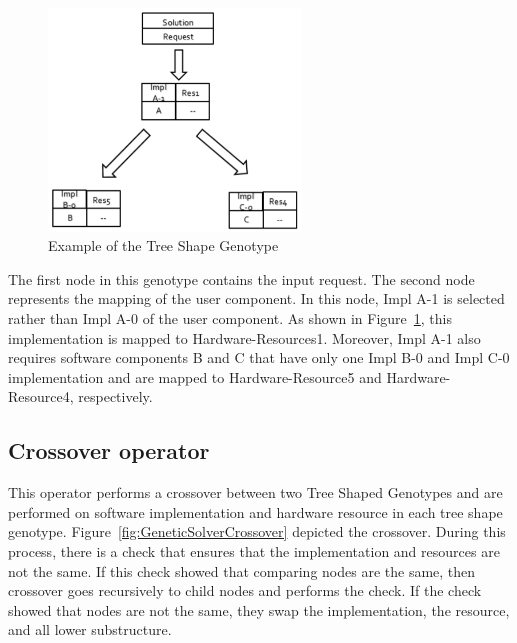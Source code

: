 \begin{figure}
	\centering
	\includegraphics[width=0.6\textwidth]{images/TreeShapeGenotypeExample.png}
	\caption[Example of the Tree Shape Genotype]{Example of the Tree Shape Genotype}
	\label{fig:TreeShapeGenotypeExample}
\end{figure}

The first node in this genotype contains the input request. The second node represents the mapping of the user component. In this node, Impl A-1 is selected rather than Impl A-0 of the user component. As shown in Figure~\ref{fig:TreeShapeGenotypeExample}, this implementation is mapped to Hardware-Resources1. Moreover, Impl A-1 also requires software components B and C that have only one Impl B-0 and Impl C-0 implementation and are mapped to Hardware-Resource5 and Hardware-Resource4, respectively.

\subsection{Crossover operator}
\label{sec:GeneticSolverCrossover}

This operator performs a crossover between two Tree Shaped Genotypes and are performed on software implementation and hardware resource in each tree shape genotype. Figure~\ref{fig:GeneticSolverCrossover} depicted the crossover. 
During this process, there is a check that ensures that the implementation and resources are not the same. If this check showed that comparing nodes are the same, then crossover goes recursively to child nodes and performs the check.
If the check showed that nodes are not the same, they swap the implementation, the resource, and all lower substructure.

